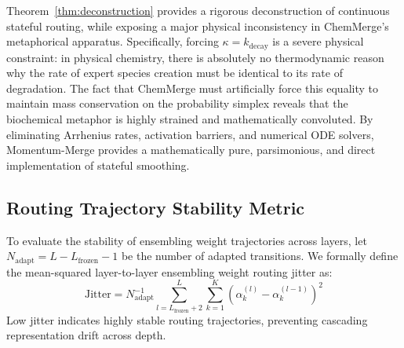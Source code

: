 Theorem~\ref{thm:deconstruction} provides a rigorous deconstruction of continuous stateful routing, while exposing a major physical inconsistency in ChemMerge's metaphorical apparatus. Specifically, forcing $\kappa = k_{\text{decay}}$ is a severe physical constraint: in physical chemistry, there is absolutely no thermodynamic reason why the rate of expert species creation must be identical to its rate of degradation. The fact that ChemMerge must artificially force this equality to maintain mass conservation on the probability simplex reveals that the biochemical metaphor is highly strained and mathematically convoluted. By eliminating Arrhenius rates, activation barriers, and numerical ODE solvers, Momentum-Merge provides a mathematically pure, parsimonious, and direct implementation of stateful smoothing.

\subsection{Routing Trajectory Stability Metric}
To evaluate the stability of ensembling weight trajectories across layers, let $N_{\text{adapt}} = L - L_{\text{frozen}} - 1$ be the number of adapted transitions. We formally define the mean-squared layer-to-layer ensembling weight routing jitter as:
\begin{equation}
    \text{Jitter} = N_{\text{adapt}}^{-1} \sum_{l=L_{\text{frozen}}+2}^{L} \sum_{k=1}^K \left(\alpha_k^{(l)} - \alpha_k^{(l-1)}\right)^2
    \label{eq:jitter_metric}
\end{equation}
Low jitter indicates highly stable routing trajectories, preventing cascading representation drift across depth.
